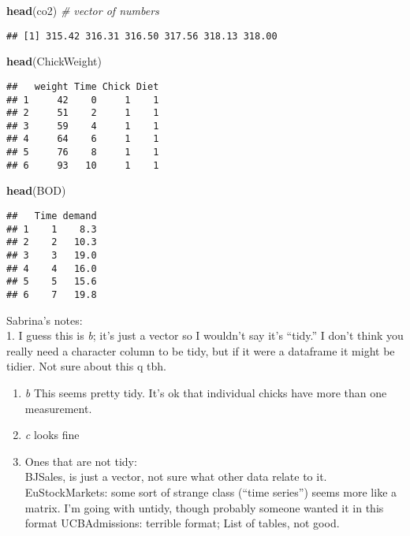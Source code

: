 \documentclass[
]{article}
\newenvironment{Shaded}{\begin{snugshade}}{\end{snugshade}}
\newcommand{\CommentTok}[1]{\textcolor[rgb]{0.56,0.35,0.01}{\textit{#1}}}
\newcommand{\FunctionTok}[1]{\textcolor[rgb]{0.13,0.29,0.53}{\textbf{#1}}}
\newcommand{\NormalTok}[1]{#1}
\begin{document}
\begin{Shaded}
\begin{Highlighting}[]
\FunctionTok{head}\NormalTok{(co2) }\CommentTok{\# vector of numbers}
\end{Highlighting}
\end{Shaded}

\begin{verbatim}
## [1] 315.42 316.31 316.50 317.56 318.13 318.00
\end{verbatim}

\begin{Shaded}
\begin{Highlighting}[]
\FunctionTok{head}\NormalTok{(ChickWeight)}
\end{Highlighting}
\end{Shaded}

\begin{verbatim}
##   weight Time Chick Diet
## 1     42    0     1    1
## 2     51    2     1    1
## 3     59    4     1    1
## 4     64    6     1    1
## 5     76    8     1    1
## 6     93   10     1    1
\end{verbatim}

\begin{Shaded}
\begin{Highlighting}[]
\FunctionTok{head}\NormalTok{(BOD)}
\end{Highlighting}
\end{Shaded}

\begin{verbatim}
##   Time demand
## 1    1    8.3
## 2    2   10.3
## 3    3   19.0
## 4    4   16.0
## 5    5   15.6
## 6    7   19.8
\end{verbatim}

Sabrina's notes:\\
1. I guess this is \emph{b}; it's just a vector so I wouldn't say it's
``tidy.'' I don't think you really need a character column to be tidy,
but if it were a dataframe it might be tidier. Not sure about this q
tbh.

\begin{enumerate}
\def\labelenumi{\arabic{enumi}.}
\setcounter{enumi}{1}
\item
  \emph{b} This seems pretty tidy. It's ok that individual chicks have
  more than one measurement.
\item
  \emph{c} looks fine
\item
  Ones that are not tidy:\\
  BJSales, is just a vector, not sure what other data relate to it.
  EuStockMarkets: some sort of strange class (``time series'') seems
  more like a matrix. I'm going with untidy, though probably someone
  wanted it in this format UCBAdmissions: terrible format; List of
  tables, not good.
\end{enumerate}
\end{document}
